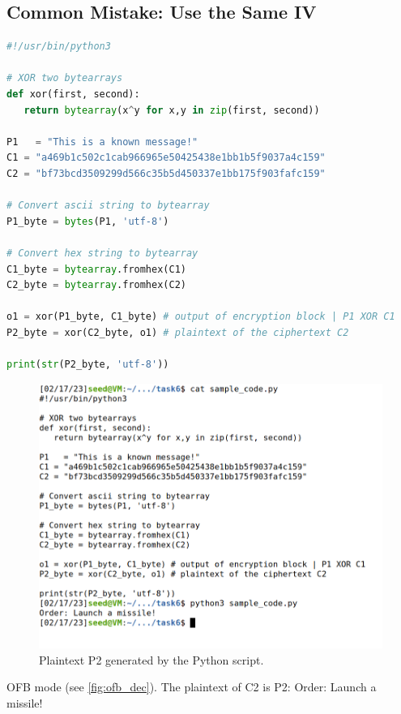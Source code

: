 \subsection{Common Mistake: Use the Same IV}
%
\begin{lstlisting}[language=Python, caption=A script that finds
    the orginal text P2 (OFB mode).]
#!/usr/bin/python3

# XOR two bytearrays
def xor(first, second):
   return bytearray(x^y for x,y in zip(first, second))

P1   = "This is a known message!"
C1 = "a469b1c502c1cab966965e50425438e1bb1b5f9037a4c159"
C2 = "bf73bcd3509299d566c35b5d450337e1bb175f903fafc159"

# Convert ascii string to bytearray
P1_byte = bytes(P1, 'utf-8')

# Convert hex string to bytearray
C1_byte = bytearray.fromhex(C1)
C2_byte = bytearray.fromhex(C2)

o1 = xor(P1_byte, C1_byte) # output of encryption block | P1 XOR C1
P2_byte = xor(C2_byte, o1) # plaintext of the ciphertext C2

print(str(P2_byte, 'utf-8'))
\end{lstlisting}

\begin{figure}
    \centering
    \includegraphics[height=\textheight,width=\textwidth,keepaspectratio]
    {figures/same_IV_OFB.png}
    \caption{Plaintext P2 generated by the Python script.}
    \label{fig:p2_script}
\end{figure}

OFB mode (see \autoref{fig:ofb_dec}).
The plaintext of C2 is
P2: {\selectfont Order: Launch a missile!}

